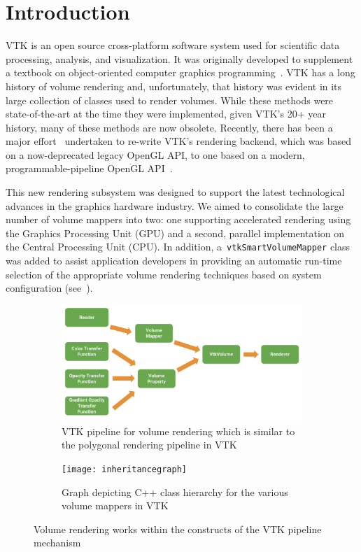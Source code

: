 \section{Introduction}
\label{introduction}
VTK is an open source cross-platform software system used for scientific data
processing, analysis, and visualization. It was originally developed to
supplement a textbook on object-oriented computer graphics
programming~\citep{schroeder_visualization_2006, geveci_vtk_2012}.  VTK has a long history of volume rendering and, unfortunately, that
history was evident in its large collection of classes used to render volumes.
While these methods were state-of-the-art at the time they were implemented,
given VTK's 20+ year history, many of these methods are now obsolete. Recently,
there has been a major effort~\citep{hanwell_visualization_2015} undertaken to
re-write VTK's rendering backend, which was based on a now-deprecated legacy 
OpenGL API, to one based on a modern, programmable-pipeline OpenGL
API~\citep{shreiner_opengl_2013}. 

This new rendering subsystem was designed to
support the latest technological advances in the graphics hardware industry.
We aimed to consolidate the large number of
volume mappers into two: one supporting accelerated rendering using the Graphics
Processing Unit (GPU) and a second, parallel implementation on the Central
Processing Unit (CPU). In addition, a~\texttt{vtkSmartVolumeMapper} class was
added to assist application developers in providing an automatic run-time selection of
the appropriate volume rendering techniques based on system configuration
(see~).

\begin{figure}
  \centering
  \begin{subfigure}[b]{\columnwidth}
    \centering
    \includegraphics[width=\columnwidth, height=0.4\textheight]{vtk_volume_pipeline}
    \caption{VTK pipeline for volume rendering which is similar to the polygonal
      rendering pipeline in VTK}
    \label{fig:pipeline}
  \end{subfigure}\vfill
  \begin{subfigure}[b]{\columnwidth}
    \centering
    \texttt{[image: inheritancegraph]}
    \caption{Graph depicting C++ class hierarchy for
      the various volume mappers in VTK}
    \label{fig:inheritancegraph}
  \end{subfigure}
  \caption{Volume rendering works within the constructs of the VTK pipeline
    mechanism}
  \label{fig:pipeline-inheritancegraph}
\end{figure}

